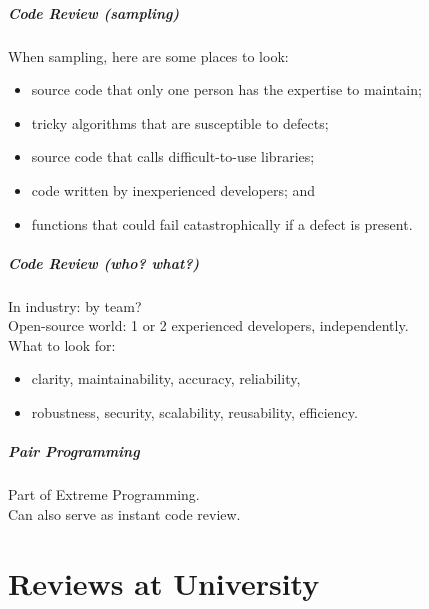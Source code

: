 \begin{frame}
\frametitle{Code Review (sampling)}

\begin{changemargin}{1cm}
When sampling, here are some places to look:
\begin{itemize}
\item source code that only one person has the expertise to maintain;
\item tricky algorithms that are susceptible to defects;
\item source code that calls difficult-to-use libraries;
\item code written by inexperienced developers; and
\item functions that could fail catastrophically if a defect is present.
\end{itemize}
\end{changemargin}
\end{frame}

\begin{frame}
\frametitle{Code Review (who? what?)}

\begin{changemargin}{1cm}
In industry: by team?\\[1em]

Open-source world: 1 or 2 experienced developers, independently.\\[1em]

What to look for:
\begin{itemize}
\item clarity, maintainability, accuracy, reliability,
\item robustness, security, scalability, reusability, efficiency.
\end{itemize}
\end{changemargin}

\end{frame}

\begin{frame}
\frametitle{Pair Programming}

\begin{changemargin}{1cm}
\Large 
Part of Extreme Programming.\\[1em]

Can also serve as instant code review.
\end{changemargin}

\end{frame}

\part{Reviews at University}
\frame{\partpage}

